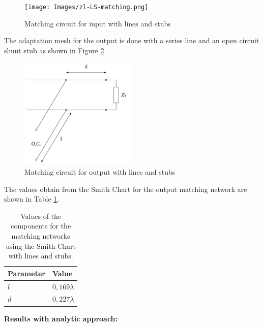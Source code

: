 \begin{figure}[H]
    \centering
    \texttt{[image: Images/zl-LS-matching.png]}
    \caption{Matching circuit for input with lines and stubs}
    \label{fig:zl-line-matching}
\end{figure}

The adaptation mesh for the output is done with a series line and an open circuit shunt stub as shown in Figure \ref{fig:zl_LS_circuit}.

\begin{figure}[h]
    \centering
    \includegraphics[width=0.5\textwidth]{Images/zl_LS_circuit.png}
    \caption{Matching circuit for output with lines and stubs}
    \label{fig:zl_LS_circuit}
\end{figure}

The values obtain from the Smith Chart for the output matching network are shown in Table \ref{tab:MatchingValuesLinesout}.

\begin{table}[H]
    \centering
    \caption{Values of the components for the matching networks using the Smith Chart with lines and stubs.}
    \begin{tabularx}{\textwidth}{>{\centering\arraybackslash}X >{\centering\arraybackslash}X}
        \toprule
        \textbf{Parameter} & \textbf{Value} \\
        \midrule
        $l$     & $0,169\lambda$ \\
        \midrule
        $d$   & $0,227\lambda$ \\
        \bottomrule
    \end{tabularx}
    \label{tab:MatchingValuesLinesout}
\end{table}

\vspace{0.4cm}
\textbf{Results with analytic approach:}
\vspace{0.4cm}

